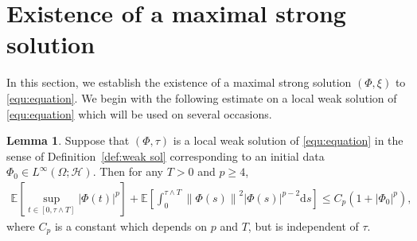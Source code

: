 \documentclass[11pt, reqno]{amsart}
\theoremstyle{definition}
\newtheorem{lemma}[theorem]{Lemma}
\numberwithin{equation}{section}
\newcommand{\bb}{\mathbb}
\newcommand{\ds}{\mathrm{d}s}
\newcommand{\norm}[1]{\left\|{#1}\right\|}
\newcommand{\abs}[1]{\left|{#1}\right|}
\begin{document}
\section{Existence of a maximal strong solution}\label{sec:max sol}

In this section, we establish the existence of a maximal strong solution $(\Phi, \xi)$ to \eqref{equ:equation}. We begin with the following estimate on a local weak solution of \eqref{equ:equation} which will be used on several occasions.

\begin{lemma}\label{lem:E abs Phi p}
	Suppose that $(\Phi,\tau)$ is a local weak solution of \eqref{equ:equation} in the sense of Definition~\ref{def:weak sol} corresponding to an initial data $\Phi_0\in L^\infty(\Omega;\mathcal{H})$. Then for any $T>0$ and $p\geq 4$,
	\begin{align*}
		\bb{E}\left[\sup_{t\in [0,\tau\wedge T]} \abs{\Phi(t)}^p \right]
		+
		\bb{E} \left[ \int_0^{\tau \wedge T} \norm{\Phi (s)}^2 \abs{\Phi (s)}^{p-2} \ds \right] 
		\leq
		C_p \left(1+\abs{\Phi_0}^p \right),
	\end{align*}
	where $C_p$ is a constant which depends on $p$ and $T$, but is independent of $\tau$.
\end{lemma}
\end{document}
